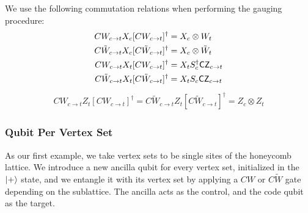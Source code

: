 \documentclass[11pt]{article}
\begin{document}
We use the following commutation relations when performing the gauging procedure: 
\begin{equation}
    \begin{aligned}
    CW_{c \rightarrow t} X_c [CW_{c \rightarrow t}]^\dagger &= X_c \otimes W_t \\
    C\tilde{W}_{c \rightarrow t} X_c [C\tilde{W}_{c \rightarrow t}]^\dagger &= X_c \otimes \tilde{W}_t \\
    CW_{c \rightarrow t} X_t [CW_{c \rightarrow t}]^\dagger &= X_t S_c^\dagger \mathsf{CZ}_{c \to t} \\
    C\tilde{W}_{c \rightarrow t} X_t [C\tilde{W}_{c \rightarrow t}]^\dagger &= X_t S_c \mathsf{CZ}_{c \to t} \\
    \end{aligned}
\end{equation}
\begin{equation}
\begin{aligned}
    CW_{c \rightarrow t} Z_t [CW_{c \rightarrow t}]^\dagger =
    C\tilde{W}_{c \rightarrow t} Z_t [C\tilde{W}_{c \rightarrow t}]^\dagger = Z_c \otimes Z_t
\end{aligned}
\end{equation}


\subsubsection{Qubit Per Vertex Set}
As our first example, we take vertex sets to be single sites of the honeycomb lattice. We introduce a new ancilla qubit for every vertex set, initialized in the $\ket{+}$ state, and we entangle it with its vertex set by applying a $CW$ or $C\tilde{W}$ gate depending on the sublattice. The ancilla acts as the control, and the code qubit as the target.
\end{document}
